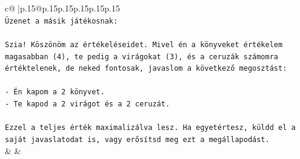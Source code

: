\documentclass{article}
\begin{document}
{\begin{supertabular}{c@{$\;$}|p{.15\linewidth}@{}p{.15\linewidth}p{.15\linewidth}p{.15\linewidth}p{.15\linewidth}p{.15\linewidth}}
{{{\\ 
\texttt{Üzenet a másik játékosnak:} \\
\\ 
\texttt{Szia! Köszönöm az értékeléseidet. Mivel én a könyveket értékelem magasabban (4), te pedig a virágokat (3), és a ceruzák számomra értéktelenek, de neked fontosak, javaslom a következő megosztást:} \\
\\ 
\texttt{{-} Én kapom a 2 könyvet.} \\
\texttt{{-} Te kapod a 2 virágot és a 2 ceruzát.} \\
\\ 
\texttt{Ezzel a teljes érték maximalizálva lesz. Ha egyetértesz, küldd el a saját javaslatodat is, vagy erősítsd meg ezt a megállapodást.} \\
            }
        }
    }
    & & \\ \\


\end{supertabular}}
\end{document}

